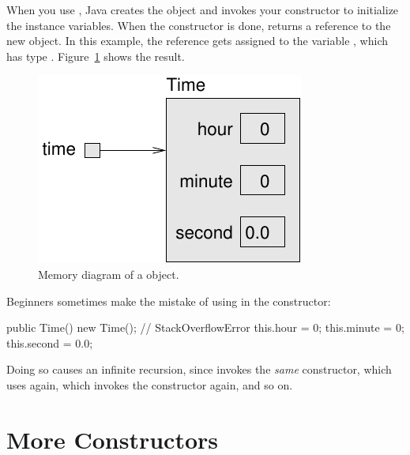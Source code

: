 
When you use , Java creates the object and invokes your constructor to initialize the instance variables.
When the constructor is done,  returns a reference to the new object.
In this example, the reference gets assigned to the variable , which has type .
Figure~\ref{fig.time} shows the result.


\begin{figure}[!ht]
\begin{center}
\includegraphics{figs/time.pdf}
\caption{Memory diagram of a  object.}
\label{fig.time}
\end{center}
\end{figure}


Beginners sometimes make the mistake of using  in the constructor:

\begin{code}
public Time() {
    new Time();         // StackOverflowError
    this.hour = 0;
    this.minute = 0;
    this.second = 0.0;
}
\end{code}

Doing so causes an infinite recursion, since  invokes the {\em same} constructor, which uses  again, which invokes the constructor again, and so on.



\section{More Constructors}

